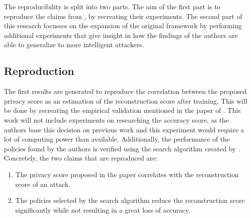 

The reproducibility is split into two parts. The aim of the first part is to reproduce the claims from \citeauthor{gao2021privacy}, by recreating their experiments. The second part of this research focusses on the expansion of the original framework by performing additional experiments that give insight in how the findings of the authors are able to generalize to more intelligent attackers.

\subsection{Reproduction}
The first results are generated to reproduce the correlation between the proposed privacy score as an estimation of the reconstruction score after training. This will be done by recreating the empirical validation mentioned in the paper of \citeauthor{gao2021privacy}. This work will not include experiments on researching the accuracy score, as the authors base this decision on previous work and this experiment would require a lot of computing power than available. Additionally, the performance of the policies found by the authors is verified using the search algorithm created by \citeauthor{gao2021privacy}.
Concretely, the two claims that are reproduced are:
\begin{enumerate}
    \item The privacy score proposed in the paper correlates with the reconstruction score of an attack.
    \item The policies selected by the search algorithm reduce the reconstruction score significantly while not resulting in a great loss of accuracy.
\end{enumerate}

